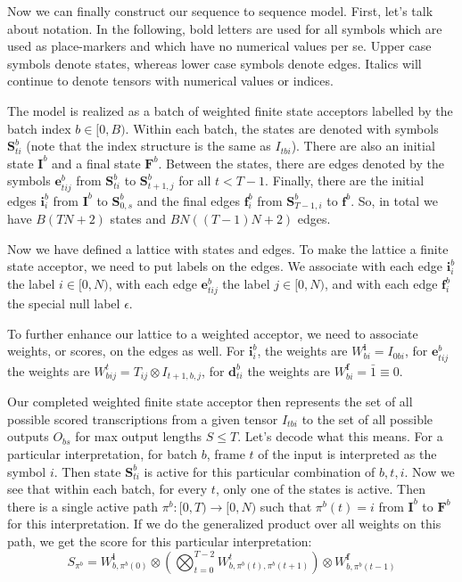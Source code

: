 \documentclass[a4paper]{article}
\begin{document}
Now we can finally construct our sequence to sequence model. First, let's talk about notation. In the following, bold letters are used for all symbols which are used as place-markers and which have no numerical values per se. Upper case symbols denote states, whereas lower case symbols denote edges. Italics will continue to denote tensors with numerical values or indices.

The model is realized as a batch of weighted finite state acceptors labelled by the batch index $b\in [0, B)$. Within each batch, the states are denoted with symbols $\mathbf{S}^{b}_{ti}$ (note that the index structure is the same as $I_{tbi}$). There are also an initial state $\mathbf{I}^b$ and a final state $\mathbf{F}^b$. Between the states, there are edges denoted by the symbols $\mathbf{e}^b_{tij}$ from $\mathbf{S}^b_{ti}$ to $\mathbf{S}^b_{t+1,j}$ for all $t<T-1$. Finally, there are the initial edges $\mathbf{i}^b_{i}$ from $\mathbf{I}^b$ to $\mathbf{S}^b_{0,s}$ and the final edges $\mathbf{f}^b_{i}$ from $\mathbf{S}^b_{T-1,i}$ to $\mathbf{f}^b$. So, in total we have $B(TN+2)$ states and $BN((T-1)N+2)$ edges.

Now we have defined a lattice with states and edges. To make the lattice a finite state acceptor, we need to put labels on the edges. We associate with each edge $\mathbf{i}^b_{i}$ the label $i\in [0, N)$, with each edge $\mathbf{e}^b_{tij}$ the label $j \in [0, N)$, and with each edge $\mathbf{f}^b_i$ the special null label $\epsilon$.

To further enhance our lattice to a weighted acceptor, we need to associate weights, or scores, on the edges as well. For $\mathbf{i}^b_{i}$, the weights are $W^{\mathbf{i}}_{bi} = I_{0bi}$, for $\mathbf{e}^b_{tij}$ the weights are $W^{t}_{bij} = T_{ij} \otimes I_{t+1, b, j}$, for $\mathbf{d}^b_{ti}$ the weights are $W^{\mathbf{f}}_{bi}=\bar{1}\equiv 0$.

Our completed weighted finite state acceptor then represents the set of all possible scored transcriptions from a given tensor $I_{tbi}$ to the set of all possible outputs $O_{bs}$ for max output lengths $S \leq T$. Let's decode what this means. For a particular interpretation, for batch $b$, frame $t$ of the input is interpreted as the symbol $i$. Then state $\mathbf{S}^b_{ti}$ is active for this particular combination of $b, t, i$. Now we see that within each batch, for every $t$, only one of the states is active. Then there is a single active path $\pi^b:[0, T)\rightarrow [0, N)$ such that $\pi^b(t)=i$ from $\mathbf{I}^b$ to $\mathbf{F}^b$ for this interpretation. If we do the generalized product over all weights on this path, we get the score for this particular interpretation:
\begin{equation}
\label{eq:S_path}
S_{\pi^b}= W^{\mathbf{i}}_{b,\pi^b(0)} \otimes \left(\bigotimes_{t=0}^{T-2}W^{t}_{b,\pi^b(t),\pi^b(t+1)}\right)\otimes W^{\mathbf{f}}_{b,\pi^b(t-1)}
\end{equation}
\end{document}
